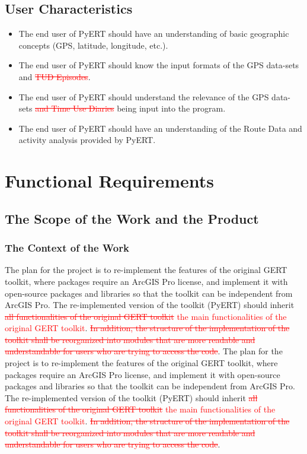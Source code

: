 \documentclass[12pt, titlepage]{article}
\begin{document}
\subsection{User Characteristics}
\begin{itemize}
    \item The end user of PyERT should have an understanding of basic geographic concepts (GPS, latitude, longitude, etc.).
    \item The end user of PyERT should know the input formats of the GPS data-sets and  \textcolor{red}{\sout{TUD Episodes}}.
    \item The end user of PyERT should understand the relevance of the GPS data-sets \textcolor{red}{\sout{and Time Use Diaries}} being input into the program.
    \item The end user of PyERT should have an understanding of the Route Data and activity analysis provided by PyERT.
\end{itemize}
\section{Functional Requirements}
\subsection{The Scope of the Work and the Product}

\subsubsection{The Context of the Work}
The plan for the project is to re-implement the features of the original GERT toolkit, where packages require an ArcGIS Pro license, and implement it with open-source packages and libraries so that the toolkit can be independent from ArcGIS Pro. The re-implemented version of the toolkit (PyERT) should inherit \textcolor{red}{\sout{all functionalities of the original GERT toolkit} the main functionalities of the original GERT toolkit}. \textcolor{red}{\sout{In addition, the structure of the implementation of the toolkit shall be reorganized into modules that are more readable and understandable for users who are trying to access the code}}.
The plan for the project is to re-implement the features of the original GERT toolkit, where packages require an ArcGIS Pro license, and implement it with open-source packages and libraries so that the toolkit can be independent from ArcGIS Pro. The re-implemented version of the toolkit (PyERT) should inherit \textcolor{red}{\sout{all functionalities of the original GERT toolkit} the main functionalities of the original GERT toolkit}. \textcolor{red}{\sout{In addition, the structure of the implementation of the toolkit shall be reorganized into modules that are more readable and understandable for users who are trying to access the code}}.
\end{document}
